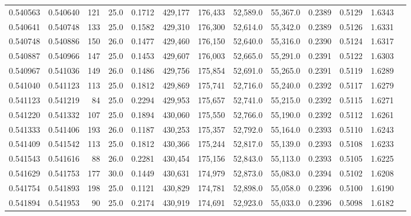 \begin{tabular}{rrrrrrrrrrrrr}
0.540563 & 0.540640 &   121 & 25.0 &                                     0.1712 & 429,177 & 176,433 &  52,589.0 &  55,367.0 & 0.2389 & 0.5129 & 1.6343 \\
0.540641 & 0.540748 &   133 & 25.0 &                                     0.1582 & 429,310 & 176,300 &  52,614.0 &  55,342.0 & 0.2389 & 0.5126 & 1.6331 \\
0.540748 & 0.540886 &   150 & 26.0 &                                     0.1477 & 429,460 & 176,150 &  52,640.0 &  55,316.0 & 0.2390 & 0.5124 & 1.6317 \\
0.540887 & 0.540966 &   147 & 25.0 &                                     0.1453 & 429,607 & 176,003 &  52,665.0 &  55,291.0 & 0.2391 & 0.5122 & 1.6303 \\
0.540967 & 0.541036 &   149 & 26.0 &                                     0.1486 & 429,756 & 175,854 &  52,691.0 &  55,265.0 & 0.2391 & 0.5119 & 1.6289 \\
0.541040 & 0.541123 &   113 & 25.0 &                                     0.1812 & 429,869 & 175,741 &  52,716.0 &  55,240.0 & 0.2392 & 0.5117 & 1.6279 \\
0.541123 & 0.541219 &    84 & 25.0 &                                     0.2294 & 429,953 & 175,657 &  52,741.0 &  55,215.0 & 0.2392 & 0.5115 & 1.6271 \\
0.541220 & 0.541332 &   107 & 25.0 &                                     0.1894 & 430,060 & 175,550 &  52,766.0 &  55,190.0 & 0.2392 & 0.5112 & 1.6261 \\
0.541333 & 0.541406 &   193 & 26.0 &                                     0.1187 & 430,253 & 175,357 &  52,792.0 &  55,164.0 & 0.2393 & 0.5110 & 1.6243 \\
0.541409 & 0.541542 &   113 & 25.0 &                                     0.1812 & 430,366 & 175,244 &  52,817.0 &  55,139.0 & 0.2393 & 0.5108 & 1.6233 \\
0.541543 & 0.541616 &    88 & 26.0 &                                     0.2281 & 430,454 & 175,156 &  52,843.0 &  55,113.0 & 0.2393 & 0.5105 & 1.6225 \\
0.541629 & 0.541753 &   177 & 30.0 &                                     0.1449 & 430,631 & 174,979 &  52,873.0 &  55,083.0 & 0.2394 & 0.5102 & 1.6208 \\
0.541754 & 0.541893 &   198 & 25.0 &                                     0.1121 & 430,829 & 174,781 &  52,898.0 &  55,058.0 & 0.2396 & 0.5100 & 1.6190 \\
0.541894 & 0.541953 &    90 & 25.0 &                                     0.2174 & 430,919 & 174,691 &  52,923.0 &  55,033.0 & 0.2396 & 0.5098 & 1.6182 \\

\end{tabular}
